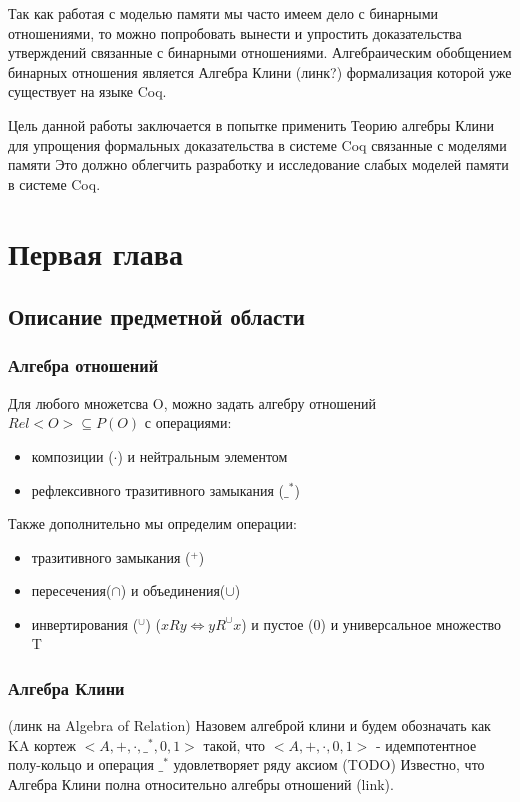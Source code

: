 \documentclass[times,specification,annotation]{itmo-student-thesis}
\begin{document}
Так как работая с моделью памяти мы часто имеем дело с бинарными отношениями, то можно попробовать вынести и упростить доказательства утверждений связанные с бинарными отношениями. Алгебраическим обобщением бинарных отношения является Алгебра Клини (линк?) формализация которой уже существует на языке Coq.

Цель данной работы заключается в попытке применить Теорию алгебры Клини для упрощения формальных доказательства в системе Coq связанные с моделями памяти Это должно облегчить разработку и исследование слабых моделей памяти в системе Coq.

\chapter{Первая глава}

  \section{Описание предметной области}

    \subsection{Алгебра отношений}
      Для любого множетсва O, можно задать алгебру отношений $ Rel<O> \subseteq P(O) $ с операциями:

      \begin{itemize}
        \item композиции ($ \cdot $) и нейтральным элементом
        \item рефлексивного тразитивного замыкания ($ \_^* $)
      \end{itemize}

      Также дополнительно мы определим операции:

      \begin{itemize}
        \item тразитивного замыкания ($ ^{+} $)
        \item пересечения($ \cap $) и объединения($ \cup $)
        \item инвертирования ($ ^\cup $) ($ x R y \Leftrightarrow y R^\cup x $)
      и пустое (0) и универсальное множество T
      \end{itemize}

    \subsection{Алгебра Клини}
      (линк на Algebra of Relation)
      Назовем алгеброй клини и будем обозначать как KA кортеж $ <A, +, \cdot, \_^*, 0, 1> $ такой, что $ <A, +, \cdot, 0, 1> $ - идемпотентное полу-кольцо и операция $ \_^* $ удовлетворяет ряду аксиом (TODO)
      Известно, что Алгебра Клини полна относительно алгебры отношений (link).
\end{document}
